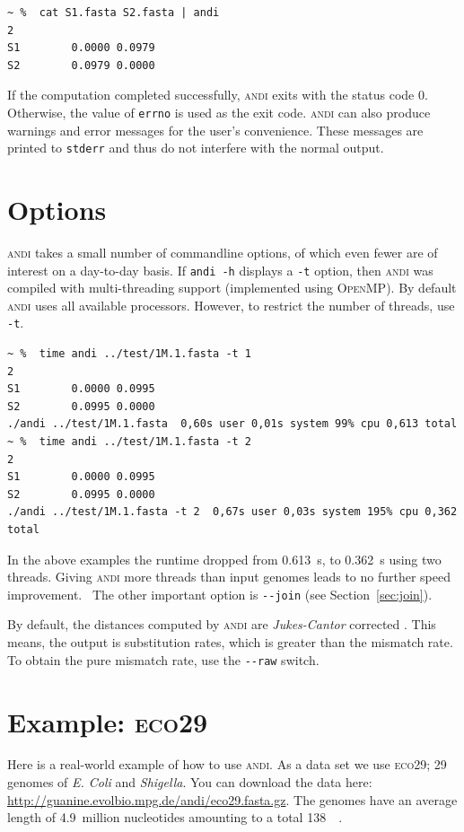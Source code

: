 \documentclass[a4paper,
  10pt,
  english,
  DIV=12,
  BCOR=8mm]{scrbook}
\newcommand{\algo}[1]{\textsc{{#1}}}
\newcommand{\andi}{\algo{andi} }
\begin{document}
\begin{lstlisting}
~ %  cat S1.fasta S2.fasta | andi
2
S1        0.0000 0.0979
S2        0.0979 0.0000
\end{lstlisting}

If the computation completed successfully, \andi exits with the status code 0. Otherwise, the value of \lstinline$errno$ is used as the exit code. \andi can also produce warnings and error messages for the user's convenience. These messages are printed to \lstinline$stderr$ and thus do not interfere with the normal output.

\section{Options}

\andi takes a small number of commandline options, of which even fewer are of interest on a day-to-day basis. If \lstinline$andi -h$ displays a \lstinline$-t$ option, then \andi was compiled with multi-threading support (implemented using \algo{OpenMP}). By default \andi uses all available processors. However, to restrict the number of threads, use \lstinline$-t$.

\begin{lstlisting}
~ %  time andi ../test/1M.1.fasta -t 1
2
S1        0.0000 0.0995
S2        0.0995 0.0000
./andi ../test/1M.1.fasta  0,60s user 0,01s system 99% cpu 0,613 total
~ %  time andi ../test/1M.1.fasta -t 2
2
S1        0.0000 0.0995
S2        0.0995 0.0000
./andi ../test/1M.1.fasta -t 2  0,67s user 0,03s system 195% cpu 0,362 total
\end{lstlisting}

In the above examples the runtime dropped from \SI{0.613}{\second}, to \SI{0.362}{\second} using two threads. Giving \andi more threads than input genomes leads to no further speed improvement. \, The other important option is \lstinline$--join$ (see Section~\ref{sec:join}).

By default, the distances computed by \andi are \emph{Jukes-Cantor} corrected \cite{jukescantor}. This means, the output is substitution rates, which is greater than the mismatch rate. To obtain the pure mismatch rate, use the \lstinline$--raw$ switch.

\section{Example: \algo{eco29}}

Here is a real-world example of how to use \algo{andi}. As a data set we use \algo{eco29}; 29 genomes of \textit{E. Coli} and \textit{Shigella}. You can download the data here: {\small{\url{http://guanine.evolbio.mpg.de/andi/eco29.fasta.gz}}}. The genomes have an average length of 4.9~million nucleotides amounting to a total \SI{138}{\mega\byte}.
\end{document}
